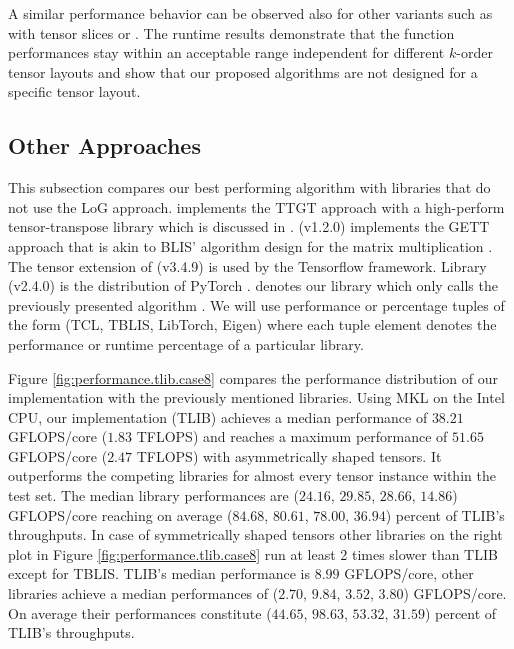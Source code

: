 A similar performance behavior can be observed also for other  variants such as  with tensor slices or .
The runtime results demonstrate that the function performances stay within an acceptable range independent for different $k$-order tensor layouts and show that our proposed algorithms are not designed for a specific tensor layout.

\subsection{Other Approaches}
This subsection compares our best performing algorithm with libraries that do not use the LoG approach.
 implements the TTGT approach with a high-perform tensor-transpose library  which is discussed in \cite{springer:2018:design}.
 (v1.2.0) implements the GETT approach that is akin to BLIS' algorithm design for the matrix multiplication \cite{matthews:2018:high}.
The tensor extension of  (v3.4.9) is used by the Tensorflow framework.
Library  (v2.4.0) is the  distribution of PyTorch \cite{paszke:2019:pytorch}.
 denotes our library which only calls the previously presented algorithm .
We will use performance or percentage tuples of the form (TCL, TBLIS, LibTorch, Eigen) where each tuple element denotes the performance or runtime percentage of a particular library.


Figure \ref{fig:performance.tlib.case8} compares the performance distribution of our implementation with the previously mentioned libraries.
Using MKL on the Intel CPU, our implementation (TLIB) achieves a median performance of $38.21$ GFLOPS/core ($1.83$ TFLOPS) and reaches a maximum performance of $51.65$ GFLOPS/core ($2.47$ TFLOPS) with asymmetrically shaped tensors.
It outperforms the competing libraries for almost every tensor instance within the test set.
The median library performances are ($24.16$, $29.85$, $28.66$, $14.86$) GFLOPS/core reaching on average ($84.68$, $80.61$, $78.00$, $36.94$) percent of TLIB's throughputs.
In case of symmetrically shaped tensors other libraries on the right plot in Figure \ref{fig:performance.tlib.case8} run at least 2 times slower than TLIB except for TBLIS.
TLIB's median performance is $8.99$ GFLOPS/core, other libraries achieve a median performances of ($2.70$, $9.84$, $3.52$, $3.80$) GFLOPS/core.
On average their performances constitute ($44.65$, $98.63$, $53.32$, $31.59$) percent of TLIB's throughputs.

